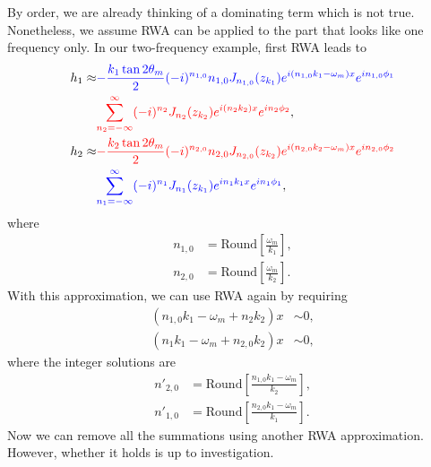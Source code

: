 By order, we are already thinking of a dominating term which is not true. Nonetheless, we assume RWA can be applied to the part that looks like one frequency only. In our two-frequency example, first RWA leads to
\begin{align}
   h_1  \approx & {\color{blue}-\frac{k_1 \tan 2\theta_m}{2} (-i)^{n_{1,0}} n_{1,0} J_{n_{1,0}} (z_{k_1}) e^{i (n_{1,0} k_1-\omega_m)x} e^{i n_{1,0}\phi_1} } \nonumber \\
   &{\color{red} \sum_{n_2=-\infty}^{\infty} (-i)^{n_2} J_{n_2}(z_{k_2}) e^{i(n_2k_2)x} e^{i n_2 \phi_2}  }, \\
   h_2  \approx & {\color{red} - \frac{k_2\tan 2\theta_m}{2} (-i)^{n_{2,0}} n_{2,0} J_{n_{2,0}}(z_{k_2}) e^{i(n_{2,0}k_2-\omega_m)x} e^{i n_{2,0} \phi_2}  } \nonumber \\
   &{\color{blue} \sum_{n_1=-\infty}^{\infty} (-i)^{n_1} J_{n_1}(z_{k_1}) e^{in_1 k_1 x} e^{i n_1 \phi_1} },
   \label{chap:matter-sec:jacobi-subsec:multi-matter-freq-eqn:eqn-after-first-rwa}
\end{align}
where
\begin{align}
   n_{1,0} &= \mathrm{Round}\left[  \frac{\omega_m}{k_1}  \right], \\
   n_{2,0} &= \mathrm{Round}\left[  \frac{\omega_m}{k_2}  \right] . 
\end{align}
With this approximation, we can use RWA again by requiring
\begin{align}
   (n_{1,0} k_1-\omega_m + n_2 k_2)x &\sim 0, \\
   (n_1 k_1-\omega_m + n_{2,0} k_2)x &\sim 0,
\end{align}
where the integer solutions are
\begin{align}
   n'_{2,0} &= \mathrm{Round}\left[ \frac{ n_{1,0} k_1-\omega_m }{k_2} \right], \\
   n'_{1,0} &= \mathrm{Round}\left[ \frac{ n_{2,0} k_1-\omega_m }{k_1} \right].
\end{align}
Now we can remove all the summations using another RWA approximation. However, whether it holds is up to investigation.

